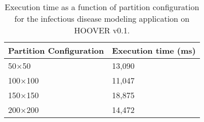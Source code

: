 \begin{table}
\centering
\begin{tabularx}{\textwidth}{ | X | X | }
\hline
Partition Configuration & Execution time (ms) \\\hline
50$\times$50            & 13,090 \\\hline
100$\times$100          & 11,047 \\\hline
150$\times$150          & 18,875 \\\hline
200$\times$200          & 14,472 \\\hline
\end{tabularx}
\caption{Execution time as a function of partition configuration for the
    infectious disease modeling application on HOOVER v0.1.}
\label{tab:partitions}
\end{table}
